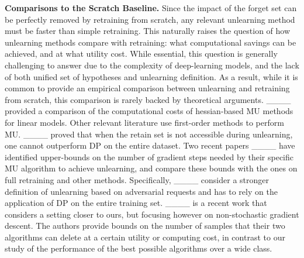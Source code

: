 \textbf{Comparisons to the Scratch Baseline.}
Since the impact of the forget set can be perfectly removed by retraining from scratch, any relevant unlearning method must be faster than simple retraining.
This naturally raises the question of how unlearning methods compare with retraining: what computational savings can be achieved, and at what utility cost. While essential, this question is generally challenging to answer due to the complexity of deep-learning models, and the lack of both unified set of hypotheses and unlearning definition. As a result, while it is common to provide an empirical comparison between unlearning and retraining from scratch, this comparison is rarely backed by theoretical arguments. ____ provided a comparison of the computational costs of hessian-based MU methods for linear models. Other relevant literature use first-order methods to perform MU. ____ proved that when the retain set is not accessible during unlearning, one cannot outperform DP on the entire dataset. Two recent papers ____ have identified upper-bounds on the number of gradient steps needed by their specific MU algorithm to achieve unlearning, and compare these bounds with the ones on full retraining and other methods. Specifically, ____ consider a stronger definition of unlearning based on adversarial requests and has to rely on the application of DP on the entire training set. ____ is a recent work that considers a setting closer to ours, but focusing however on non-stochastic gradient descent. The authors provide bounds on the number of samples that their two algorithms can delete at a certain utility or computing cost, in contrast to our study of the performance of the best possible algorithms over a wide class.